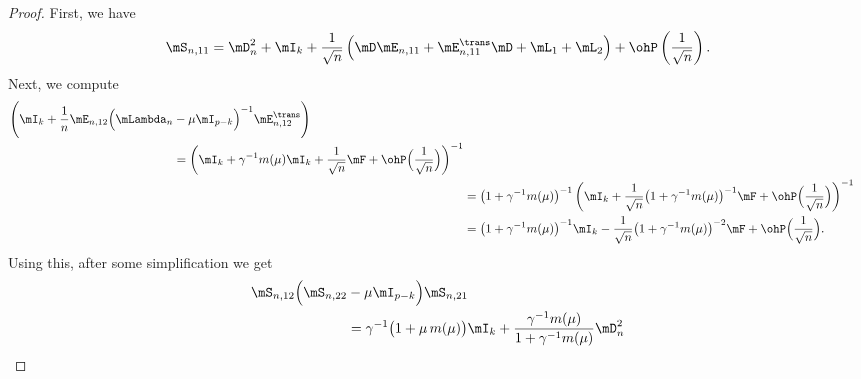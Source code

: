 \begin{proof}
    First, we have
    \[
        \mS_{n,11} 
            = 
                \mD_n^2 + \mI_k
                + 
                \frac{1}{\sqrt{n}}
                \left(
                    \mD \mE_{n,11}
                    +
                    \mE_{n,11}^\trans \mD
                    +
                    \mL_1
                    +
                    \mL_2
                \right)
                +
                \ohP\left( \frac{1}{\sqrt{n}} \right).
    \]
    Next, we compute
    \begin{align*}
        \begin{split}
        \Bigg(
            \mI_k
            +
            \frac{1}{n}
            \mE_{n,12}
            \Big(
                \mLambda_n &- \mu \mI_{p-k}
            \Big)^{-1}
            \mE_{n,12}^\trans
        \Bigg) \\
            &=
                \left(
                    \mI_k
                    +
                    \gamma^{-1}
                    m( \mu )
                    \mI_k
                    +
                    \frac{1}{\sqrt{n}}
                    \mF
                    +
                    \ohP\Big( \frac{1}{\sqrt{n}} \Big)
                \right)^{-1} 
        \end{split} \\
            &=
                \big(1 + \gamma^{-1} m(\mu)\big)^{-1}
                \left(
                    \mI_k
                    +
                    \frac{1}{\sqrt{n}}
                    \big( 1 + \gamma^{-1} m(\mu) \big)^{-1}
                    \mF
                    +
                    \ohP\Big( \frac{1}{\sqrt{n}} \Big)
                \right)^{-1} \\
            &=
                \big( 1 + \gamma^{-1} m(\mu) \big)^{-1} \mI_k
                -
                \frac{1}{\sqrt{n}}
                \big( 1 + \gamma^{-1} m(\mu) \big)^{-2}
                \mF
                +
                \ohP\Big( \frac{1}{\sqrt{n}} \Big).              
    \end{align*}
    Using this, after some simplification we get
    \[
        \begin{split}
            \mS_{n,12} \Big( \mS_{n,22} &- \mu \mI_{p-k} \Big) \mS_{n,21} \\
                &=
                \gamma^{-1}
                \big( 1 + \mu \, m(\mu) \big) \mI_k
                +
                \frac{\gamma^{-1} m(\mu)}
                     { 1 + \gamma^{-1} m(\mu)} \mD_n^2 \\

\end{split}\]
\end{proof}
